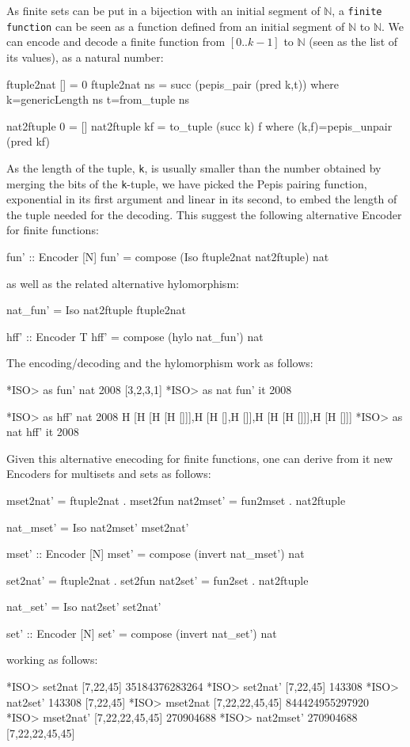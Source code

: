 \documentclass[]{INCLUDES/llncs}
\begin{document}
As finite sets can be put in a bijection with an initial segment 
of $\mathbb{N}$,
a {\tt finite function} can be seen as a function defined from an
initial segment of $\mathbb{N}$ to $\mathbb{N}$.
We can encode and decode a finite function from $[0..k-1]$ to $\mathbb{N}$ 
(seen as the list of its values), as a natural number:
\begin{code} 
ftuple2nat [] = 0
ftuple2nat ns = succ (pepis_pair (pred k,t)) where
  k=genericLength ns 
  t=from_tuple ns

nat2ftuple 0 = []
nat2ftuple kf = to_tuple (succ k) f where 
  (k,f)=pepis_unpair (pred kf)
\end{code}
As the length of the tuple, {\tt k}, is usually smaller than the number 
obtained by merging the bits of the {\tt k}-tuple, we have picked the 
Pepis pairing function, exponential in its first argument and linear 
in its second, to embed the length of the tuple needed for the decoding. 
This suggest the following alternative Encoder for finite functions:
\begin{code}
fun' :: Encoder [N]
fun' = compose (Iso ftuple2nat nat2ftuple) nat
\end{code}
as well as the related alternative hylomorphism:
\begin{code}
nat_fun' = Iso nat2ftuple ftuple2nat

hff' :: Encoder T
hff' = compose (hylo nat_fun') nat
\end{code}

The encoding/decoding and the hylomorphism work as follows:
\begin{codex}
*ISO> as fun' nat 2008
[3,2,3,1]
*ISO> as nat fun' it
2008

*ISO> as hff' nat 2008
H [H [H [H []]],H [H [],H []],H [H [H []]],H [H []]]
*ISO> as nat hff' it
2008
\end{codex}
Given this alternative enecoding for finite functions, one can derive from it
new Encoders for multisets and sets as follows:
\begin{code}
mset2nat' = ftuple2nat . mset2fun
nat2mset' = fun2mset . nat2ftuple

nat_mset' = Iso nat2mset' mset2nat' 

mset' :: Encoder [N]
mset' = compose (invert nat_mset') nat

set2nat' = ftuple2nat . set2fun
nat2set' = fun2set . nat2ftuple 

nat_set' = Iso nat2set' set2nat' 

set' :: Encoder [N]
set' = compose (invert nat_set') nat
\end{code}
working as follows:
\begin{codex}
*ISO> set2nat [7,22,45]
35184376283264
*ISO> set2nat' [7,22,45]
143308
*ISO> nat2set' 143308
[7,22,45]
*ISO> mset2nat [7,22,22,45,45]
844424955297920
*ISO> mset2nat' [7,22,22,45,45]
270904688
*ISO> nat2mset' 270904688
[7,22,22,45,45]
\end{codex}
\end{document}
